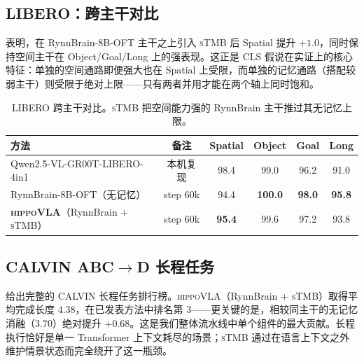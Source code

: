 \documentclass[10pt,letterpaper,fontset=fandol]{ctexart}
\newcommand{\method}{\textsc{hippoVLA}\xspace}
\newcommand{\sTMB}{\textsc{sTMB}\xspace}
\begin{document}
\subsection{LIBERO：跨主干对比}
\label{sec:exp-libero-cross}
 表明，在 RynnBrain-8B-OFT 主干之上引入 \sTMB 后 Spatial 提升 $+1.0$，同时保持空间主干在 Object/Goal/Long 上的强表现。这正是 CLS 假说在实证上的核心特征：单独的空间通路即便强大也在 Spatial 上受限，而单独的记忆通路（搭配较弱主干）则受限于绝对上限——只有两者并用才能在两个轴上同时饱和。

\begin{table}[t]
\centering
\small
\caption{LIBERO 跨主干对比。\sTMB 把空间能力强的 RynnBrain 主干推过其无记忆上限。}
\label{tab:libero-cross}
\begin{tabular}{lccccc}
\toprule
方法 & 备注 & Spatial & Object & Goal & Long \\
\midrule
Qwen2.5-VL-GR00T-LIBERO-4in1            & 本机复现     & 98.4 & 99.0 & 96.2 & 91.0 \\
RynnBrain-8B-OFT（无记忆）              & step 60k    & 94.4 & \textbf{100.0} & \textbf{98.0} & \textbf{95.8} \\
\textbf{\method}（RynnBrain + \sTMB）   & step 60k    & \textbf{95.4} & 99.6 & 97.2 & 93.8 \\
\bottomrule
\end{tabular}
\end{table}

\subsection{CALVIN ABC$\rightarrow$D 长程任务}
\label{sec:exp-calvin}
 给出完整的 CALVIN 长程任务排行榜。\method（RynnBrain + \sTMB）取得平均完成长度 $4.38$，在已发表方法中排名第 3——更关键的是，相较同主干的无记忆消融（3.70）绝对提升 $+0.68$。这是我们整体流水线中单个组件的最大贡献。长程执行恰好是单一 Transformer 上下文耗尽的场景；\sTMB 通过在语言上下文之外维护情景状态而完全绕开了这一瓶颈。
\end{document}
